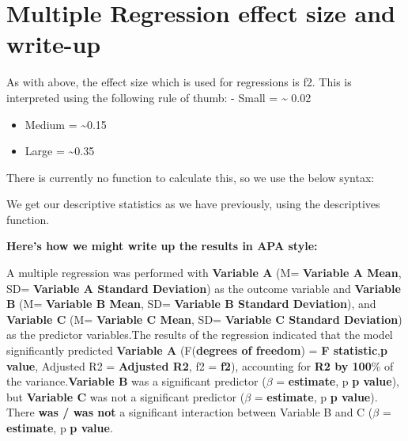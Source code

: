 \documentclass[
]{book}
\newenvironment{Shaded}{\begin{snugshade}}{\end{snugshade}}
\newcommand{\CommentTok}[1]{\textcolor[rgb]{0.56,0.35,0.01}{\textit{#1}}}
\newcommand{\DecValTok}[1]{\textcolor[rgb]{0.00,0.00,0.81}{#1}}
\newcommand{\NormalTok}[1]{#1}
\newcommand{\OtherTok}[1]{\textcolor[rgb]{0.56,0.35,0.01}{#1}}
\newcommand{\SpecialCharTok}[1]{\textcolor[rgb]{0.81,0.36,0.00}{\textbf{#1}}}
\begin{document}
\section{Multiple Regression effect size and write-up}\label{multiple-regression-effect-size-and-write-up}

As with above, the effect size which is used for regressions is f2. This is interpreted using the following rule of thumb: - Small = \textasciitilde{} 0.02

\begin{itemize}
\item
  Medium = \textasciitilde0.15
\item
  Large = \textasciitilde0.35
\end{itemize}

There is currently no function to calculate this, so we use the below syntax:

\begin{Shaded}
\end{Shaded}

We get our descriptive statistics as we have previously, using the descriptives function.

\textbf{Here's how we might write up the results in APA style:}

A multiple regression was performed with \textbf{Variable A} (M= \textbf{Variable A Mean}, SD= \textbf{Variable A Standard Deviation}) as the outcome variable and \textbf{Variable B} (M= \textbf{Variable B Mean}, SD= \textbf{Variable B Standard Deviation}), and \textbf{Variable C} (M= \textbf{Variable C Mean}, SD= \textbf{Variable C Standard Deviation}) as the predictor variables.The results of the regression indicated that the model significantly predicted \textbf{Variable A} (F(\textbf{degrees of freedom}) = \textbf{F statistic},\textbf{p value}, Adjusted R2 = \textbf{Adjusted R2}, f2 = \textbf{f2}), accounting for \textbf{R2 by 100}\% of the variance.\textbf{Variable B} was a significant predictor (\(\beta\) = \textbf{estimate}, p \textbf{p value}), but \textbf{Variable C} was not a significant predictor (\(\beta\) = \textbf{estimate}, p \textbf{p value}). There \textbf{was / was not} a significant interaction between Variable B and C (\(\beta\) = \textbf{estimate}, p \textbf{p value}.
\end{document}
